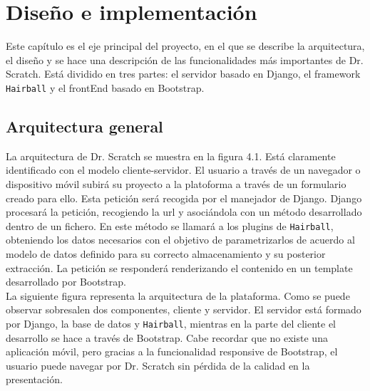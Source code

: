 \documentclass[a4paper, 12pt]{book}
\begin{document}

\cleardoublepage
\chapter{Diseño e implementación}

Este capítulo es el eje principal del proyecto, en el que se describe la arquitectura,
el diseño y se hace una descripción de las funcionalidades más importantes de Dr.
Scratch. Está dividido en tres partes: el servidor basado en Django, el framework
\texttt{Hairball} y el frontEnd basado en Bootstrap.


\section{Arquitectura general}
\label{sec:arquitectura}

La arquitectura de Dr. Scratch se muestra en la figura 4.1. Está claramente identificado
con el modelo cliente-servidor. El usuario a través de un navegador o dispositivo móvil
subirá su proyecto a la platoforma a través de un formulario creado para ello. Esta 
petición será recogida por el manejador de Django. Django procesará la petición, recogiendo
la url y asociándola con un método desarrollado dentro de un fichero. En este método
se llamará a los plugins de \texttt{Hairball}, obteniendo los datos necesarios con el
objetivo de parametrizarlos de acuerdo  al modelo de datos definido para su correcto 
almacenamiento y su posterior extracción. La petición se responderá renderizando 
el contenido en un template desarrollado por Bootstrap. \\


La siguiente figura representa la arquitectura de la plataforma. Como se puede observar
sobresalen dos componentes, cliente y servidor. El servidor está formado por Django,
la base de datos y \texttt{Hairball}, mientras en la parte del cliente el desarrollo
se hace a través de Bootstrap. Cabe recordar que no existe una aplicación móvil, 
pero gracias a la funcionalidad responsive de Bootstrap, el usuario puede 
navegar por Dr. Scratch sin pérdida de la calidad en la presentación. \\
\end{document}
